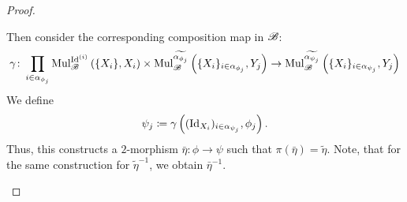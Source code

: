 \begin{proof}
\begin{enumerate}
\begin{center}
        \end{center}
        Then consider the corresponding composition map in $\mathscr{B}$:
        \[
            \gamma \colon \prod_{i \in \alpha_{\phi_j}} \operatorname{Mul}_{\mathscr{B}}^{\operatorname{Id}^{(i)}}\left(\{X_i\}, X_i\right) \times \operatorname{Mul}_{\mathscr{B}}^{\widetilde{\alpha_{\phi_j}}}\left(\{X_i\}_{i \in \alpha_{\phi_j}}, Y_j\right) \to \operatorname{Mul}_{\mathscr{B}}^{\widetilde{\alpha_{\psi_j}}}\left(\{X_i\}_{i \in \alpha_{\psi_j}}, Y_j\right)
        \]
        We define
        \[
            \psi_j \coloneqq \gamma\left((\operatorname{Id}_{X_i})_{i \in \alpha_{\psi_j}}, \phi_j\right).
        \]
        Thus, this constructs a $2$-morphism $\bar{\eta} \colon \phi \to \psi$ such that $\pi(\bar{\eta}) = \widetilde{\eta}$.
        Note, that for the same construction for $\widetilde{\eta}^{-1}$, we obtain $\bar{\eta}^{-1}$.

\end{enumerate}
\end{proof}
